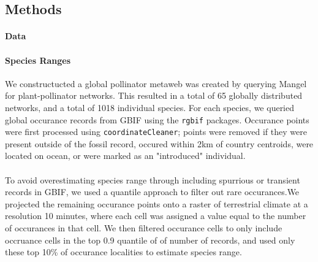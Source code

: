 \documentclass[12pt]{article}
\begin{document}
\paragraph*{}






\paragraph*{}




\paragraph*{}













\subsection*{Methods}

\paragraph*{Data}




\paragraph*{Species Ranges}
  We constructucted a global pollinator metaweb was created by querying Mangel for plant-pollinator networks. This resulted in a total of 65 globally distributed networks, and a total of 1018 individual species. For each species, we queried global occurance records from GBIF using the \texttt{rgbif} packages. Occurance points were first processed using \texttt{coordinateCleaner}; points were removed if they were present outside of the fossil record, occured within 2km of country centroids, were located on ocean, or were marked as an "introduced" individual.
\paragraph{}To avoid overestimating species range through including spurrious or transient records in GBIF, we used a quantile approach to filter out rare occurances.We projected the remaining occurance points onto a raster of terrestrial climate at a resolution 10 minutes, where each cell was assigned a value equal to the number of occurances in that cell. We then filtered occurance cells to only include occruance cells in the top 0.9 quantile of of number of records, and used only these top 10\% of occurance localities to estimate species range.
\end{document}
